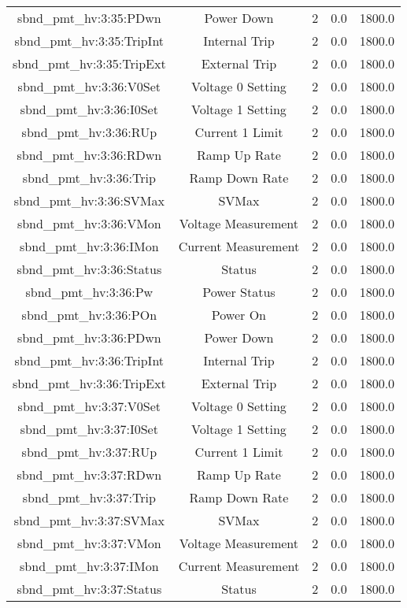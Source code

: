 \begin{table}[ptb]
\begin{tabular}{c | c c c c}
sbnd_pmt_hv:3:35:PDwn & Power Down & 2 & 0.0 & 1800.0\\ 
sbnd_pmt_hv:3:35:TripInt & Internal Trip & 2 & 0.0 & 1800.0\\ 
sbnd_pmt_hv:3:35:TripExt & External Trip & 2 & 0.0 & 1800.0\\ 
sbnd_pmt_hv:3:36:V0Set & Voltage 0 Setting & 2 & 0.0 & 1800.0\\ 
sbnd_pmt_hv:3:36:I0Set & Voltage 1 Setting & 2 & 0.0 & 1800.0\\ 
sbnd_pmt_hv:3:36:RUp & Current 1 Limit & 2 & 0.0 & 1800.0\\ 
sbnd_pmt_hv:3:36:RDwn & Ramp Up Rate & 2 & 0.0 & 1800.0\\ 
sbnd_pmt_hv:3:36:Trip & Ramp Down Rate & 2 & 0.0 & 1800.0\\ 
sbnd_pmt_hv:3:36:SVMax & SVMax & 2 & 0.0 & 1800.0\\ 
sbnd_pmt_hv:3:36:VMon & Voltage Measurement & 2 & 0.0 & 1800.0\\ 
sbnd_pmt_hv:3:36:IMon & Current Measurement & 2 & 0.0 & 1800.0\\ 
sbnd_pmt_hv:3:36:Status & Status & 2 & 0.0 & 1800.0\\ 
sbnd_pmt_hv:3:36:Pw & Power Status & 2 & 0.0 & 1800.0\\ 
sbnd_pmt_hv:3:36:POn & Power On & 2 & 0.0 & 1800.0\\ 
sbnd_pmt_hv:3:36:PDwn & Power Down & 2 & 0.0 & 1800.0\\ 
sbnd_pmt_hv:3:36:TripInt & Internal Trip & 2 & 0.0 & 1800.0\\ 
sbnd_pmt_hv:3:36:TripExt & External Trip & 2 & 0.0 & 1800.0\\ 
sbnd_pmt_hv:3:37:V0Set & Voltage 0 Setting & 2 & 0.0 & 1800.0\\ 
sbnd_pmt_hv:3:37:I0Set & Voltage 1 Setting & 2 & 0.0 & 1800.0\\ 
sbnd_pmt_hv:3:37:RUp & Current 1 Limit & 2 & 0.0 & 1800.0\\ 
sbnd_pmt_hv:3:37:RDwn & Ramp Up Rate & 2 & 0.0 & 1800.0\\ 
sbnd_pmt_hv:3:37:Trip & Ramp Down Rate & 2 & 0.0 & 1800.0\\ 
sbnd_pmt_hv:3:37:SVMax & SVMax & 2 & 0.0 & 1800.0\\ 
sbnd_pmt_hv:3:37:VMon & Voltage Measurement & 2 & 0.0 & 1800.0\\ 
sbnd_pmt_hv:3:37:IMon & Current Measurement & 2 & 0.0 & 1800.0\\ 
sbnd_pmt_hv:3:37:Status & Status & 2 & 0.0 & 1800.0\\ 

\end{tabular}
\end{table}
